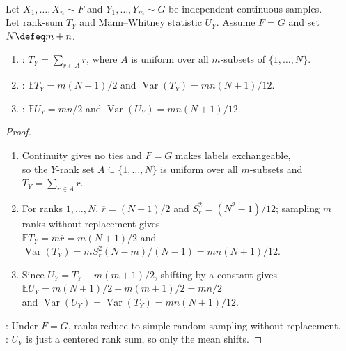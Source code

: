 \begin{theorem} \label{thm:mann-whitney-rank-sum-mean-variance} \\
Let $X_1,\ldots,X_n\sim F$ and $Y_1,\ldots,Y_m\sim G$ be independent continuous samples.\\
Let rank-sum $T_Y$ and Mann--Whitney statistic $U_Y$. Assume $F=G$ and set $N\defeq m+n$.
\begin{enumerate}[label=(\roman*)]
\setlength{\itemsep}{0pt}
\item {}: $T_Y=\sum_{r\in A}r$, where $A$ is uniform over all $m$-subsets of $\{1,\ldots,N\}$.
\item {}: $\mathbb{E}T_Y=m(N+1)/2$ and $\operatorname{Var}(T_Y)=mn(N+1)/12$.
\item {}: $\mathbb{E}U_Y=mn/2$ and $\operatorname{Var}(U_Y)=mn(N+1)/12$.
\end{enumerate}
\begin{proof}
\begin{enumerate}[label=(\roman*)]
\setlength{\itemsep}{0pt}
\item Continuity gives no ties and $F=G$ makes labels exchangeable,\\
so the $Y$-rank set $A\subseteq\{1,\ldots,N\}$ is uniform over all $m$-subsets and $T_Y=\sum_{r\in A}r$.
\item For ranks $1,\ldots,N$, $\overline{r}=(N+1)/2$ and $S_r^2=(N^2-1)/12$; sampling $m$ ranks without replacement gives\\
$\mathbb{E}T_Y=m\overline{r}=m(N+1)/2$ and $\operatorname{Var}(T_Y)=mS_r^2(N-m)/(N-1)=mn(N+1)/12$.
\item Since $U_Y=T_Y-m(m+1)/2$, shifting by a constant gives $\mathbb{E}U_Y=m(N+1)/2-m(m+1)/2=mn/2$\\
and $\operatorname{Var}(U_Y)=\operatorname{Var}(T_Y)=mn(N+1)/12$.
\end{enumerate}
: Under $F=G$, ranks reduce to simple random sampling without replacement.\\
: $U_Y$ is just a centered rank sum, so only the mean shifts.
\end{proof}
\end{theorem}

